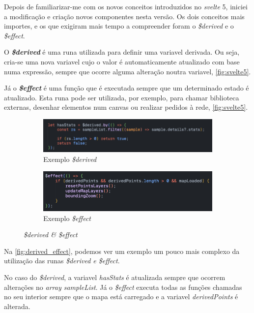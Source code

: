 Depois de familiarizar-me com os novos conceitos introduzidos no \textit{svelte} 5, iniciei a modificação e criação novos componentes nesta versão. Os dois conceitos mais importes, e os que exigiram mais tempo a compreender foram o \textit{\$derived} e o \textit{\$effect}.

O \textbf{\textit{\$derived}} é uma runa utilizada para definir uma variavel derivada. Ou seja, cria-se uma nova variavel cujo o valor é automaticamente atualizado com base numa expressão, sempre que ocorre alguma alteração noutra variavel, \autoref{fig:svelte5}.

Já o \textbf{\textit{\$effect}} é uma função que é executada sempre que um determinado estado é atualizado. Esta runa pode ser utilizada, por exemplo, para chamar biblioteca externas, desenhar elementos num canvas ou realizar pedidos à rede, \autoref{fig:svelte5}.

\begin{figure}[!h]
	\centering
	\begin{subfigure}[c]{0.45\textwidth}
		\centering
		\includegraphics[width=\textwidth]{figs/derived.png}
		\caption{Exemplo \textit{\$derived}}
		\label{fig:derived}
	\end{subfigure}
	\hfill
	\begin{subfigure}[c]{0.45\textwidth}
		\centering
		\includegraphics[width=\textwidth]{figs/effect.png}
		\caption{Exemplo \textit{\$effect}}
		\label{fig:effect}
	\end{subfigure}
	\caption{\textit{\$derived \& \$effect}}
    \label{fig:derived_effect}
\end{figure}

Na \autoref{fig:derived_effect}, podemos ver um exemplo um pouco mais complexo da utilização das runas \textit{\$derived e \$effect}. 

No caso do \textit{\$derived}, a variavel \textit{hasStats} é atualizada sempre que ocorrem alterações no \textit{array sampleList}. Já o \textit{\$effect} executa todas as funções chamadas no seu interior sempre que o mapa está carregado e a variavel \textit{derivedPoints} é alterada.

